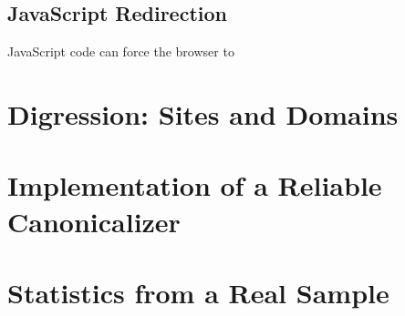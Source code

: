 \documentclass[oneside]{zarticle}
\begin{document}
\subsection{JavaScript Redirection}\label{sec:jsredir}

JavaScript code can force the browser to 

\section{Digression: Sites and Domains}

\section{Implementation of a Reliable Canonicalizer}



\section{Statistics from a Real Sample}\label{sec:stats}
\end{document}
